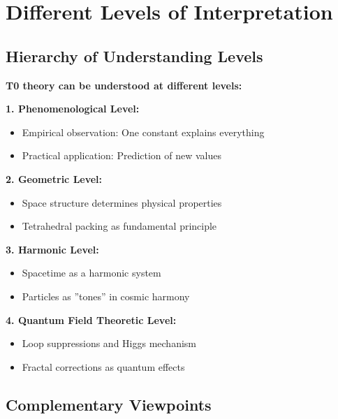 	\section{Different Levels of Interpretation}
	
	\subsection{Hierarchy of Understanding Levels}
	
	\begin{foundation}
		\textbf{T0 theory can be understood at different levels:}
		
		\textbf{1. Phenomenological Level:}
		\begin{itemize}
			\item Empirical observation: One constant explains everything
			\item Practical application: Prediction of new values
		\end{itemize}
		
		\textbf{2. Geometric Level:}
		\begin{itemize}
			\item Space structure determines physical properties
			\item Tetrahedral packing as fundamental principle
		\end{itemize}
		
		\textbf{3. Harmonic Level:}
		\begin{itemize}
			\item Spacetime as a harmonic system
			\item Particles as ''tones'' in cosmic harmony
		\end{itemize}
		
		\textbf{4. Quantum Field Theoretic Level:}
		\begin{itemize}
			\item Loop suppressions and Higgs mechanism
			\item Fractal corrections as quantum effects
		\end{itemize}
	\end{foundation}
	
	\subsection{Complementary Viewpoints}
	
